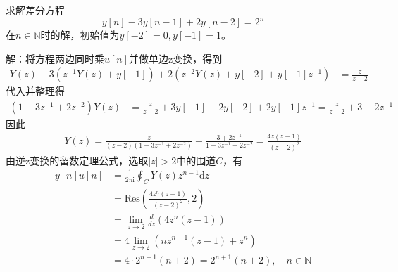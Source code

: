 \begin{example}
    求解差分方程
    $$y[n]-3y[n-1]+2y[n-2]=2^n$$
    在$n\in\mathbb{N}$时的解，初始值为$y[-2]=0,y[-1]=1$。

    解：将方程两边同时乘$u[n]$并做单边z变换，得到\begin{align*}
    Y(z)-3(z^{-1}Y(z)+y[-1])+2(z^{-2}Y(z)+y[-2]+y[-1]z^{-1})&=\frac{z}{z-2}
    \end{align*}
    代入并整理得\begin{align*}
    (1-3z^{-1}+2z^{-2})Y(z)&=\frac{z}{z-2}+3y[-1]-2y[-2]+2y[-1]z^{-1}=\frac{z}{z-2}+3-2z^{-1}
    \end{align*}
    因此\begin{align*}
    Y(z)=\frac{z}{(z-2)(1-3z^{-1}+2z^{-2})}+\frac{3+2z^{-1}}{1-3z^{-1}+2z^{-2}}=\frac{4z(z-1)}{(z-2)^2}
    \end{align*}
    由逆z变换的留数定理公式，选取$|z|>2$中的围道$C$，有\begin{align*}
    y[n]u[n]&=\frac{1}{2\pi\mathrm{i}}\oint_{C}Y(z)z^{n-1}\mathrm{d}z\\
    &=\mathrm{Res}\left(\frac{4z^n(z-1)}{(z-2)^2},2\right)\\
    &=\lim_{z\to 2}\frac{d}{dz}\left(4z^n(z-1)\right)\\
    &=4\lim_{z\to 2}\left(nz^{n-1}(z-1)+z^n\right)\\
    &=4\cdot 2^{n-1}(n+2)=2^{n+1}(n+2),\quad n\in\mathbb{N}
\end{align*}
\end{example}

